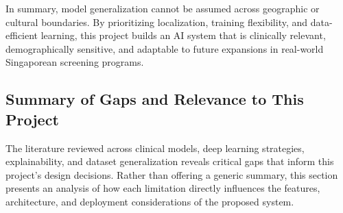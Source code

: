 \documentclass[12pt]{article}
\begin{document}
In summary, model generalization cannot be assumed across geographic or cultural boundaries. By prioritizing localization, training flexibility, and data-efficient learning, this project builds an AI system that is clinically relevant, demographically sensitive, and adaptable to future expansions in real-world Singaporean screening programs.

\subsection{Summary of Gaps and Relevance to This Project}

The literature reviewed across clinical models, deep learning strategies, explainability, and dataset generalization reveals critical gaps that inform this project’s design decisions. Rather than offering a generic summary, this section presents an analysis of how each limitation directly influences the features, architecture, and deployment considerations of the proposed system.
\end{document}
